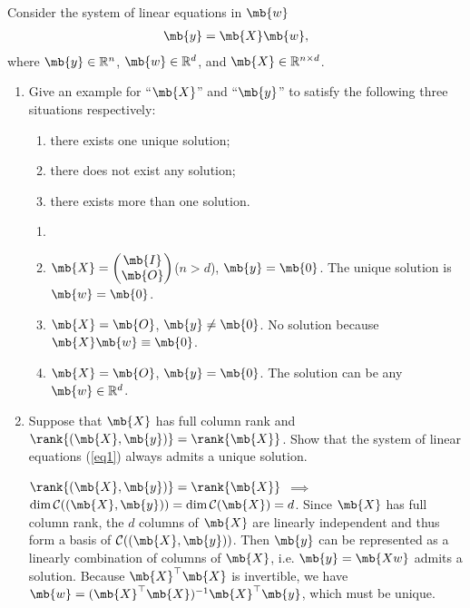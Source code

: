 \newpage
\begin{exercise}

	Consider the system of linear equations in $\mb{w}$
	\begin{align}\label{eq1}
		\mb{y} = \mb{X} \mb{w} ,
	\end{align}
	where $\mb{y} \in \mathbb{R}^{n}$, $\mb{w} \in \mathbb{R}^{d}$, and $\mb{X} \in \mathbb{R}^{n \times d}$.

	\begin{enumerate}
		\item Give an example for ``$\mb{X}$'' and ``$\mb{y}$'' to satisfy the following three situations respectively:
			\begin{enumerate}
				\item there exists one unique solution;
				\item there does not exist any solution;
				\item there exists more than one solution.
			\end{enumerate}

			\begin{solution}
				\begin{enumerate}
					\item []
					\item $\mb{X}=\begin{pmatrix}\mb{I}\\\mb{O}\end{pmatrix}$($n>d$), $\mb{y}=\mb{0}$. The unique solution is $\mb{w}=\mb{0}$.
					\item $\mb{X}=\mb{O}$, $\mb{y}\neq\mb{0}$. No solution because $\mb{X}\mb{w}\equiv\mb{0}$.
					\item $\mb{X}=\mb{O}$, $\mb{y}=\mb{0}$. The solution can be any $\mb{w}\in\mathbb{R}^d$.
						\qedhere
				\end{enumerate}
			\end{solution}

		\item Suppose that $\mb{X}$ has full column rank and $\rank{(\mb{X}, \mb{y})} = \rank{\mb{X}}$. Show that the system of linear equations (\ref{eq1}) always admits a unique solution.

			\begin{solution}
				$\rank{(\mb{X}, \mb{y})} = \rank{\mb{X}}$ $\implies$ $\dim{\mathcal{C}((\mb{X}, \mb{y}))} = \dim{\mathcal{C}(\mb{X})} = d$. Since $\mb{X}$ has full column rank, the $d$ columns of $\mb{X}$ are linearly independent and thus form a basis of $\mathcal{C}((\mb{X}, \mb{y}))$. Then $\mb{y}$ can be represented as a linearly combination of columns of $\mb{X}$, i.e. $\mb{y} = \mb{Xw}$ admits a solution. Because $\mb{X}^\top\mb{X}$ is invertible, we have $\mb{w} = (\mb{X}^\top\mb{X})^{-1}\mb{X}^\top\mb{y}$, which must be unique.
				\qedhere
			\end{solution}


\end{enumerate}
\end{exercise}
